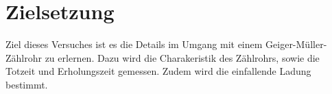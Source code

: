 \section{Zielsetzung}
\label{sec:Ziel}
Ziel dieses Versuches ist es die Details im Umgang mit einem
Geiger-Müller-Zählrohr zu erlernen.
Dazu wird die Charakeristik des Zählrohrs, sowie die Totzeit und Erholungszeit
gemessen. Zudem wird die einfallende Ladung bestimmt.
